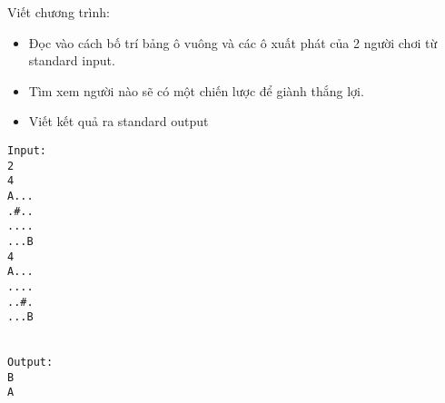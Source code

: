 Viết chương trình:  
\begin{itemize}
	\item     Đọc vào cách bố trí bảng ô vuông và các ô xuất phát của 2 người chơi từ standard input.   
	\item     Tìm xem người nào sẽ có một chiến lược để giành thắng lợi.   
	\item     Viết kết quả ra standard output   
\end{itemize}
\begin{verbatim}
Input:
2
4
A...
.#..
....
...B
4
A...
....
..#.
...B


Output:
B
A

\end{verbatim}